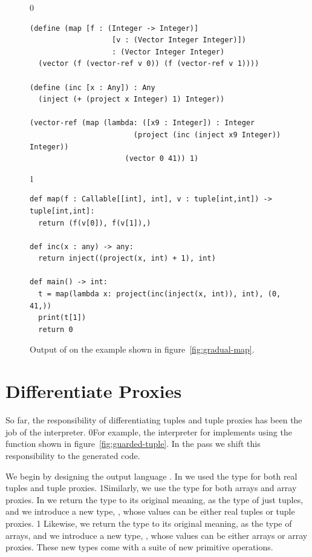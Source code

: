 \documentclass[7x10]{TimesAPriori_MIT}%
\def\racketEd{0}
\def\pythonEd{1}
\def\edition{1}
\newcommand{\racket}[1]{{\if\edition\racketEd{#1}\fi}}
\newcommand{\pythonColor}[0]{}
\newcommand{\python}[1]{{\if\edition\pythonEd\pythonColor #1\fi}}
\numberwithin{theorem}{chapter}
\numberwithin{definition}{chapter}
\numberwithin{equation}{chapter}
\begin{document}
\begin{figure}[tbp]
\begin{tcolorbox}[colback=white]  
{\if\edition\racketEd    
\begin{lstlisting}
(define (map [f : (Integer -> Integer)]
                   [v : (Vector Integer Integer)])
                   : (Vector Integer Integer)
  (vector (f (vector-ref v 0)) (f (vector-ref v 1))))

(define (inc [x : Any]) : Any
  (inject (+ (project x Integer) 1) Integer))

(vector-ref (map (lambda: ([x9 : Integer]) : Integer
                        (project (inc (inject x9 Integer)) Integer))
                      (vector 0 41)) 1)
\end{lstlisting}
\fi}
{\if\edition\pythonEd\pythonColor
\begin{lstlisting}[basicstyle=\ttfamily\footnotesize]
def map(f : Callable[[int], int], v : tuple[int,int]) -> tuple[int,int]:
  return (f(v[0]), f(v[1]),)

def inc(x : any) -> any:
  return inject((project(x, int) + 1), int)

def main() -> int:
  t = map(lambda x: project(inc(inject(x, int)), int), (0, 41,))
  print(t[1])
  return 0
\end{lstlisting}
\fi}
\end{tcolorbox}

\caption{Output of  on the example shown in
  figure~\ref{fig:gradual-map}.}
\label{fig:map-lower-cast}
\end{figure}


\section{Differentiate Proxies}
\label{sec:differentiate-proxies}

So far, the responsibility of differentiating tuples and tuple proxies
has been the job of the interpreter.
%
\racket{For example, the interpreter for \LangCast{} implements
  \code{vector-ref} using the \code{guarded-vector-ref} function shown in
  figure~\ref{fig:guarded-tuple}.}
%
In the  pass we shift this responsibility
to the generated code.

We begin by designing the output language \LangPVec{}.  In \LangGrad{}
we used the type \TUPLETYPENAME{} for both
real tuples and tuple proxies.
\python{Similarly, we use the type  for both arrays and
array proxies.}
In \LangPVec{} we return the
\TUPLETYPENAME{} type to its original
meaning, as the type of just tuples, and we introduce a new type,
\PTUPLETYNAME{}, whose values
can be either real tuples or tuple
proxies.
%
{\if\edition\pythonEd\pythonColor
Likewise, we return the
\ARRAYTYPENAME{} type to its original
meaning, as the type of arrays, and we introduce a new type,
\PARRAYTYNAME{}, whose values
can be either arrays or array proxies.
These new types come with a suite of new primitive operations.
\fi}
\end{document}
